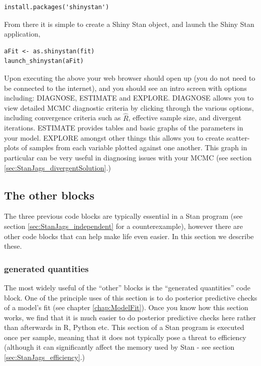\documentclass[11pt,fullpage]{book}
\begin{document}
\begin{verbatim}
install.packages('shinystan')
\end{verbatim}

From there it is simple to create a Shiny Stan object, and launch the Shiny Stan application,

\begin{verbatim}
aFit <- as.shinystan(fit)
launch_shinystan(aFit)
\end{verbatim}

Upon executing the above your web browser should open up (you do not need to be connected to the internet), and you should see an intro screen with options including: DIAGNOSE, ESTIMATE and EXPLORE. DIAGNOSE allows you to view detailed MCMC diagnostic criteria by clicking through the various options, including convergence criteria such as $\hat{R}$, effective sample size, and divergent iterations. ESTIMATE provides tables and basic graphs of the parameters in your model. EXPLORE amongst other things this allows you to create scatter-plots of samples from each variable plotted against one another. This graph in particular can be very useful in diagnosing issues with your MCMC (see section \ref{sec:StanJags_divergentSolution}.) 

\subsection{The other blocks}
The three previous code blocks are typically essential in a Stan program (see section \ref{sec:StanJags_independent} for a counterexample), however there are other code blocks that can help make life even easier. In this section we describe these.

\subsubsection{generated quantities}
The most widely useful of the ``other'' blocks is the ``generated quantities'' code block. One of the principle uses of this section is to do posterior predictive checks of a model's fit (see chapter \ref{chap:ModelFit}). Once you know how this section works, we find that it is much easier to do posterior predictive checks here rather than afterwards in R, Python etc. This section of a Stan program is executed once per sample, meaning that it does not typically pose a threat to efficiency (although it can significantly affect the memory used by Stan - see section \ref{sec:StanJags_efficiency}.)
\end{document}
